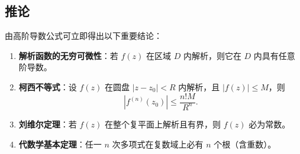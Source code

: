 \subsection*{推论}
由高阶导数公式可立即得出以下重要结论：
\begin{enumerate}
	\item \textbf{解析函数的无穷可微性}：若 $f(z)$ 在区域 $D$ 内解析，则它在 $D$ 内具有任意阶导数。
	\item \textbf{柯西不等式}：设 $f(z)$ 在圆盘 $|z-z_0|<R$ 内解析，且 $|f(z)|\le M$，则
	\[
	|f^{(n)}(z_0)| \le \frac{n! M}{R^n}.
	\]
	\item \textbf{刘维尔定理}：若 $f(z)$ 在整个复平面上解析且有界，则 $f(z)$ 必为常数。
	\item \textbf{代数学基本定理}：任一 $n$ 次多项式在复数域上必有 $n$ 个根（含重数）。
\end{enumerate}

